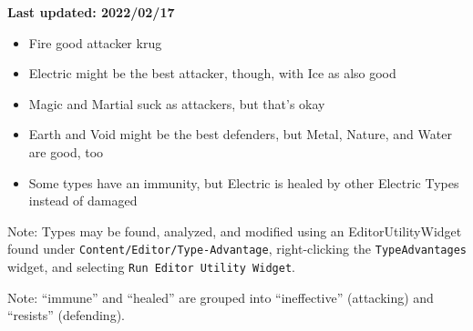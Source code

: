 

\textbf{\color{red}Last updated: 2022/02/17}

\begin{tldr}
	\begin{itemize}
		\item{Fire good attacker krug}
		\item{Electric might be the best attacker, though, with Ice as also good}
		\item{Magic and Martial suck as attackers, but that's okay}
		\item{Earth and Void might be the best defenders, but Metal, Nature, and Water are good, too}
		\item{Some types have an immunity, but Electric is healed by other Electric Types instead of damaged}
	\end{itemize}
	Note: Types may be found, analyzed, and modified using an EditorUtilityWidget found under \texttt{Content/Editor/Type-Advantage}, right-clicking the \texttt{TypeAdvantages} widget, and selecting \texttt{Run Editor Utility Widget}.
\end{tldr}


Note: ``immune'' and ``healed'' are grouped into ``ineffective'' (attacking) and ``resists'' (defending).

